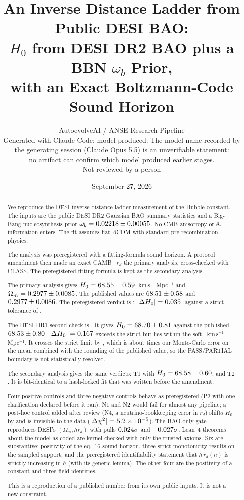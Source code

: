 \documentclass[11pt]{article}
\title{An Inverse Distance Ladder from Public DESI BAO:\\
$H_0$ from DESI DR2 BAO plus a BBN $\omega_b$ Prior,\\
with an Exact Boltzmann-Code Sound Horizon}
\author{AutoevolveAI / ANSE Research Pipeline \\
\small Generated with Claude Code; model-produced. The model name recorded by \\
\small the generating session (Claude Opus 5.5) is an unverifiable statement: \\
\small no artifact can confirm which model produced earlier stages. \\
\small Not reviewed by a person}
\date{September 27, 2026}
\begin{document}
\sloppy
\maketitle

\begin{abstract}
We reproduce the DESI inverse-distance-ladder measurement of the Hubble
constant. The inputs are the public DESI DR2 Gaussian BAO summary
statistics \cite{desi2025dr2} and a Big-Bang-nucleosynthesis prior
$\omega_b=0.02218\pm0.00055$. No CMB anisotropy or $\theta_*$
information enters. The fit assumes
flat $\Lambda$CDM with standard pre-recombination physics.

The analysis was preregistered with a fitting-formula sound horizon. A
protocol amendment then made an exact CAMB~\CambVer{} $r_d$ the primary
analysis, cross-checked with CLASS. The preregistered fitting formula is
kept as the secondary analysis.

The primary analysis gives
$H_0=68.55\pm0.59$~km\,s$^{-1}$\,Mpc$^{-1}$ and
$\Omega_m=0.2977\pm0.0085$. The published values are
$68.51\pm0.58$ and $0.2977\pm0.0086$. The preregistered
verdict is \textbf{\PTOneVerdict}: $|\Delta H_0|=0.035$, against a strict
tolerance of \TolStrict{}.

The DESI DR1 second check is \textbf{\PTTwoVerdict}. It gives
$H_0=68.70\pm0.81$ against the published $68.53\pm0.80$.
$|\Delta H_0|=0.167$ exceeds the strict \TolStrict{} but lies within the
soft \TolSoft{}~km\,s$^{-1}$\,Mpc$^{-1}$. It crosses the strict limit by
\TTwoMarginP, which is about \TTwoResRatioP{} times our Monte-Carlo error on
the mean combined with the rounding of the published value, so the
PASS/PARTIAL boundary is not statistically resolved.

The secondary analysis gives the same verdicts: T1 \STOneVerdict{} with
$H_0=68.58\pm0.60$, and T2 \STTwoVerdict. It is bit-identical to a
hash-locked fit that was written before the amendment.

Four positive controls and three negative controls behave as preregistered
(P2 with one clarification declared before it ran). N1 and N2 would fail
for almost any pipeline; a post-hoc control added after review (N4, a
neutrino-bookkeeping error in $r_d$) shifts $H_0$ by \NFourShift{} and is
invisible to the data ($|\Delta\chi^2|=5.2\times10^{-5}$).
The BAO-only gate reproduces DESI's $(\Omega_m, h r_d)$ with pulls
$0.024\sigma$ and $-0.027\sigma$. \LeanNThm{} Lean~4 theorems about
the model as coded are kernel-checked with only the trusted axioms. Six
are substantive: positivity of the eq.~16 sound horizon, three
strict-monotonicity results on the sampled support, and the preregistered
identifiability statement that $h\,r_d(h)$ is strictly increasing in $h$
(with its generic lemma). The other four are the positivity of a constant
and three field identities.

This is a reproduction of a published number from its own public inputs.
It is not a new constraint.
\end{abstract}
\end{document}
